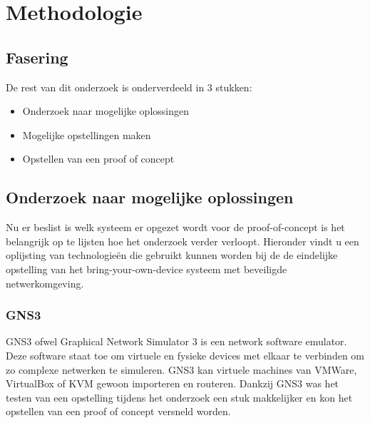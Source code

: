
\chapter{Methodologie}
\label{ch:methodologie}


\section{Fasering}

De rest van dit onderzoek is onderverdeeld in 3 stukken:
\begin{itemize}
	\item Onderzoek naar mogelijke oplossingen
	\item Mogelijke opstellingen maken
	\item Opstellen van een proof of concept
\end{itemize}

\section{Onderzoek naar mogelijke oplossingen}
Nu er beslist is welk systeem er opgezet wordt voor de proof-of-concept is het belangrijk op te lijsten hoe het onderzoek verder verloopt. Hieronder vindt u een oplijsting van technologie\"{e}n die gebruikt kunnen worden bij de de eindelijke opstelling van het bring-your-own-device systeem met beveiligde netwerkomgeving.

\subsection{GNS3}
GNS3 ofwel Graphical Network Simulator 3 is een network software emulator. Deze software staat toe om virtuele en fysieke devices met elkaar te verbinden om zo complexe netwerken te simuleren. GNS3 kan virtuele machines van VMWare, VirtualBox of KVM gewoon importeren en routeren. Dankzij GNS3 was het testen van een opstelling tijdens het onderzoek een stuk makkelijker en kon het opstellen van een proof of concept versneld worden.

